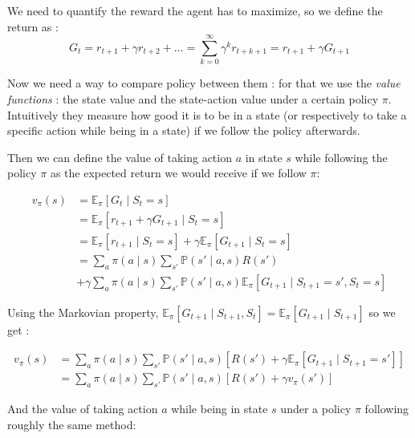 \documentclass[14pt,a4paper]{article}
\theoremstyle{definition}
\begin{document}
We need to quantify the reward the agent has to maximize, so we define the return as : 
$$G_t= r_{t+1}+\gamma r_{t+2}+ \dots = \sum_{k=0}^{\infty}\gamma^{k}r_{t+k+1} = r_{t+1} + \gamma G_{t+1} $$





Now we need a way to compare policy between them : for that we use the \emph{value functions} : the state value and the state-action value under a certain policy $\pi$. Intuitively they measure how good it is to be in a state (or respectively to take a specific action while being in a state) if we follow the policy afterwards.


Then we can define the value of taking action $a$ in state $s$ while following the policy $\pi$ as the expected return we would receive if we follow $\pi$:


\begin{equation*}
\begin{split}
v_{\pi}(s)&= \mathbb{E}_{\pi}[G_t \mid S_t=s]
\\&=\mathbb{E}_{\pi}\left[ r_{t+1} + \gamma G_{t+1} \mid S_t = s\right]
\\&=\mathbb{E}_{\pi}\left[ r_{t+1} \mid S_t = s \right] + \gamma \mathbb{E}_{\pi}\left[G_{t+1} \mid S_t = s \right]
\\&=\sum_{a}\pi(a \mid s)\sum_{s'}\mathbb{P}(s' \mid a,s)R(s') 
\\&+ \gamma \sum_{a}\pi(a \mid s)\sum_{s'}\mathbb{P}(s'\mid a,s)\mathbb{E}_{\pi}\left[G_{t+1} \mid S_{t+1} = s', S_{t}= s\right]
\end{split}
\end{equation*}

Using the Markovian property, $\mathbb{E}_{\pi}\left[G_{t+1} \mid S_{t+1}, S_{t}\right] = \mathbb{E}_{\pi}\left[G_{t+1} \mid S_{t+1}\right] $ so we get : 

\begin{equation}
\begin{split}
v_{\pi}(s)&= \sum_{a}\pi(a \mid s)\sum_{s'}\mathbb{P}(s'\mid a,s)\left[R(s') +\gamma \mathbb{E}_{\pi}\left[  G_{t+1} \mid S_{t+1}=s'  \right]\right]
\\&=\sum_{a}\pi(a \mid s)\sum_{s'}\mathbb{P}(s'\mid a,s)\left[R(s') + \gamma v_{\pi}(s')\right]
\end{split}
\label{v(s)}
\end{equation}



And the value of taking action $a$ while being in state $s$ under a policy $\pi$ following roughly the same method:
\end{document}
